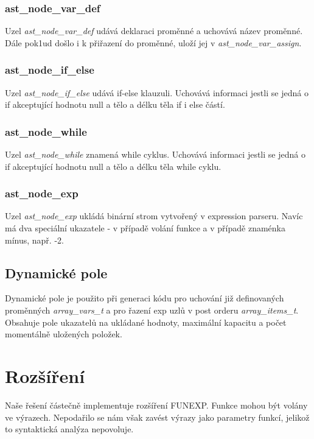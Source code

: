\documentclass[a4paper, 12pt]{article}
\begin{document}
\subsubsection{ast\_node\_var\_def}
Uzel \textit{ast\_node\_var\_def} udává deklaraci proměnné a uchovává název proměnné. Dále pok1ud došlo i k přiřazení do proměnné, uloží jej v \textit{ast\_node\_var\_assign}.\
\subsubsection{ast\_node\_if\_else}
Uzel \textit{ast\_node\_if\_else} udává if-else klauzuli. Uchovává informaci jestli se jedná o if akceptující hodnotu null a tělo a délku těla if i else částí. 
\subsubsection{ast\_node\_while}
Uzel \textit{ast\_node\_while} znamená while cyklus. Uchovává informaci jestli se jedná o if akceptující hodnotu null a tělo a délku těla while cyklu.
\subsubsection{ast\_node\_exp}
Uzel \textit{ast\_node\_exp} ukládá binární strom vytvořený v expression parseru. Navíc má dva speciální ukazatele - v případě volání funkce a v případě znaménka mínus, např. -2.

\subsection{Dynamické pole}
Dynamické pole je použito při generaci kódu pro uchování již definovaných proměnných \textit{array\_vars\_t} a pro řazení exp uzlů v post orderu \textit{array\_items\_t}. Obsahuje pole ukazatelů na ukládané hodnoty, maximální kapacitu a počet momentálně uložených položek.

\newpage
{}
\section{Rozšíření}
Naše řešení částečně implementuje rozšíření FUNEXP.\newline
Funkce mohou být volány ve výrazech. Nepodařilo se nám však zavést výrazy jako parametry funkcí, jelikož to syntaktická analýza nepovoluje.
\end{document}

